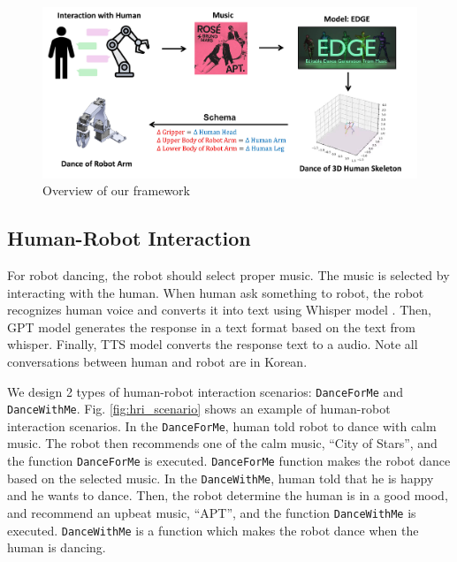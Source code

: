 \documentclass[letterpaper, 10 pt, conference]{ieeeconf}  %
\begin{document}
\begin{figure}[h]
    \centering
    \includegraphics[width=\linewidth]{figures/figure_overview.jpg}
    \caption{Overview of our framework}\label{fig:overview}
\end{figure}

\subsection{Human-Robot Interaction}
For robot dancing, the robot should select proper music. The music is selected by interacting with the human. When human ask something to robot, the robot recognizes human voice and converts it into text using Whisper model \cite{radford2023robust}. Then, GPT model \cite{openai2024gpt4omini} generates the response in a text format based on the text from whisper. Finally, TTS model converts the response text to a audio. Note all conversations between human and robot are in Korean. 

We design 2 types of human-robot interaction scenarios: \texttt{DanceForMe} and \texttt{DanceWithMe}. Fig. \ref{fig:hri_scenario} shows an example of human-robot interaction scenarios. In the \texttt{DanceForMe}, human told robot to dance with calm music. The robot then recommends one of the calm music, “City of Stars”, and the function \texttt{DanceForMe} is executed. \texttt{DanceForMe} function makes the robot dance based on the selected music. In the \texttt{DanceWithMe}, human told that he is happy and he wants to dance. Then, the robot determine the human is in a good mood, and recommend an upbeat music, “APT”, and the function \texttt{DanceWithMe} is executed. \texttt{DanceWithMe} is a function which makes the robot dance when the human is dancing.
\end{document}
